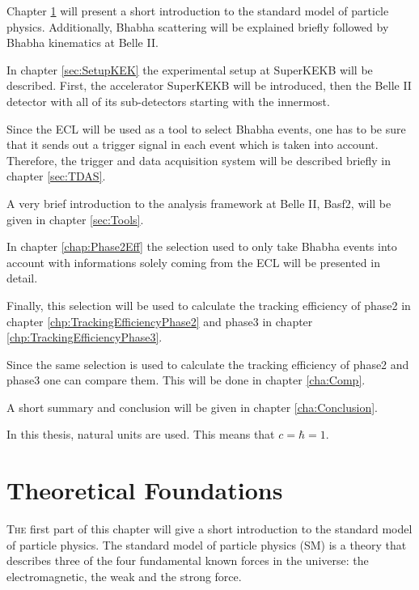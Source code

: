 \documentclass[a4paper,11pt,twosided,final,german,openbib,pdftex,listof=totoc,bibliography=totoc]{scrbook}
\begin{document}


Chapter \ref{cha:SM} will present a short introduction to the standard model of particle physics. Additionally, Bhabha scattering will be explained briefly followed by Bhabha kinematics at Belle II. 

In chapter \ref{sec:SetupKEK} the experimental setup at SuperKEKB will be described. First, the accelerator SuperKEKB will be introduced, then the Belle II detector with all of its sub-detectors starting with the innermost.

Since the ECL will be used as a tool to select Bhabha events, one has to be sure that it sends out a trigger signal in each event which is taken into account. Therefore, the trigger and data acquisition system will be described briefly in chapter \ref{sec:TDAS}.  

A very brief introduction to the analysis framework at Belle II, Basf2, will be given in chapter \ref{sec:Tools}.

In chapter \ref{chap:Phase2Eff} the selection used to only take Bhabha events into account with informations solely coming from the ECL will be presented in detail. 

Finally, this selection will be used to calculate the tracking efficiency of phase2 in chapter \ref{chp:TrackingEfficiencyPhase2} and phase3 in chapter \ref{chp:TrackingEfficiencyPhase3}.

Since the same selection is used to calculate the tracking efficiency of phase2 and phase3 one can compare them. This will be done in chapter \ref{cha:Comp}.

A short summary and conclusion will be given in chapter \ref{cha:Conclusion}.
\newline 

In this thesis, natural units are used. This means that $c = \hbar = 1$.
\newline


\chapter{Theoretical Foundations}
\label{cha:SM}

\lettrine{T}{he} first part of this chapter will give  a short introduction to the standard model of particle physics. The standard model of particle physics (SM) is a theory that describes three of the four fundamental known forces in the universe: the electromagnetic, the weak and the strong force. 
\end{document}

